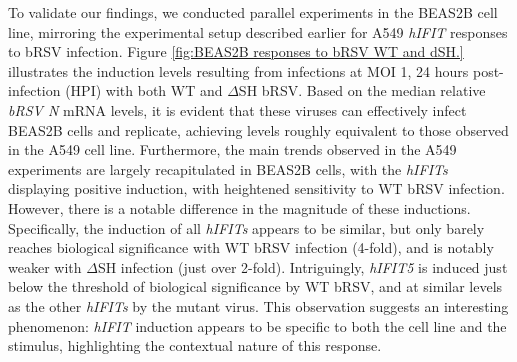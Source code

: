 To validate our findings, we conducted parallel experiments in the BEAS2B cell line, mirroring the experimental setup described earlier for A549 \textit{hIFIT} responses to bRSV infection. Figure \ref{fig:BEAS2B responses to bRSV WT and dSH.} illustrates the induction levels resulting from infections at MOI 1, 24 hours post-infection (HPI) with both WT and \(\Delta\)SH bRSV. Based on the median relative \textit{bRSV N} mRNA levels, it is evident that these viruses can effectively infect BEAS2B cells and replicate, achieving levels roughly equivalent to those observed in the A549 cell line. Furthermore, the main trends observed in the A549 experiments are largely recapitulated in BEAS2B cells, with the \textit{hIFITs} displaying positive induction, with heightened sensitivity to WT bRSV infection. However, there is a notable difference in the magnitude of these inductions. Specifically, the induction of all \textit{hIFITs} appears to be similar, but only barely reaches biological significance with WT bRSV infection (4-fold), and is notably weaker with \(\Delta\)SH infection (just over 2-fold). Intriguingly, \textit{hIFIT5} is induced just below the threshold of biological significance by WT bRSV, and at similar levels as the other \textit{hIFITs} by the mutant virus. This observation suggests an interesting phenomenon: \textit{hIFIT} induction appears to be specific to both the cell line and the stimulus, highlighting the contextual nature of this response.

